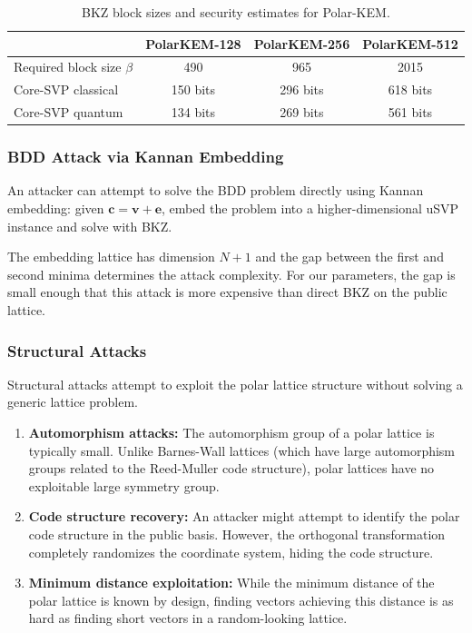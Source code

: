 \documentclass[11pt,a4paper]{article}
\newcommand{\polarKem}{\textsf{Polar-KEM}\xspace}
\newcommand{\BDD}{\textsf{BDD}\xspace}
\newcommand{\usvp}{\textsf{uSVP}\xspace}
\begin{document}
\begin{table}[H]
\centering
\caption{BKZ block sizes and security estimates for \polarKem.}
\label{tab:bkz}
\begin{tabular}{@{}lccc@{}}
\toprule
 & \textbf{PolarKEM-128} & \textbf{PolarKEM-256} & \textbf{PolarKEM-512} \\
\midrule
Required block size $\beta$ & 490 & 965 & 2015 \\
Core-SVP classical & 150 bits & 296 bits & 618 bits \\
Core-SVP quantum & 134 bits & 269 bits & 561 bits \\
\bottomrule
\end{tabular}
\end{table}

\subsubsection{BDD Attack via Kannan Embedding}

An attacker can attempt to solve the \BDD problem directly using Kannan embedding: given $\mathbf{c} = \mathbf{v} + \mathbf{e}$, embed the problem into a higher-dimensional \usvp instance and solve with BKZ.

The embedding lattice has dimension $N+1$ and the gap between the first and second minima determines the attack complexity. For our parameters, the gap is small enough that this attack is more expensive than direct BKZ on the public lattice.

\subsubsection{Structural Attacks}

Structural attacks attempt to exploit the polar lattice structure without solving a generic lattice problem.

\begin{enumerate}[leftmargin=2em]
\item \textbf{Automorphism attacks:} The automorphism group of a polar lattice is typically small. Unlike Barnes-Wall lattices (which have large automorphism groups related to the Reed-Muller code structure), polar lattices have no exploitable large symmetry group.

\item \textbf{Code structure recovery:} An attacker might attempt to identify the polar code structure in the public basis. However, the orthogonal transformation completely randomizes the coordinate system, hiding the code structure.

\item \textbf{Minimum distance exploitation:} While the minimum distance of the polar lattice is known by design, finding vectors achieving this distance is as hard as finding short vectors in a random-looking lattice.
\end{enumerate}
\end{document}
